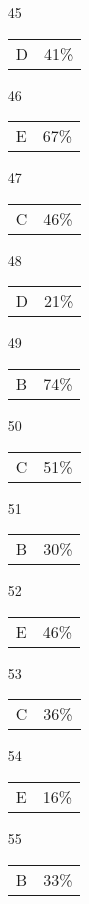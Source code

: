 \documentclass{article}
\begin{document}
\begin{multicols}{4}
\begin{enumerate}
    \item[45] \begin{tabular}{cc} D & 41\%\end{tabular}
    
       \item[]
    
    \item[46] \begin{tabular}{cc} E & 67\%\end{tabular}
    
    \item[47] \begin{tabular}{cc} C & 46\%\end{tabular}
    
    \item[48] \begin{tabular}{cc} D & 21\%\end{tabular}
    
    \item[49] \begin{tabular}{cc} B & 74\%\end{tabular}
    
    \item[50] \begin{tabular}{cc} C & 51\%\end{tabular}
    
       \item[]
    
    \item[51] \begin{tabular}{cc} B & 30\%\end{tabular}
    
    \item[52] \begin{tabular}{cc} E & 46\%\end{tabular}
    
    \item[53] \begin{tabular}{cc} C & 36\%\end{tabular}
    
    \item[54] \begin{tabular}{cc} E & 16\%\end{tabular}
    
    \item[55] \begin{tabular}{cc} B & 33\%\end{tabular}
    

\end{enumerate}
\end{multicols}
\end{document}
